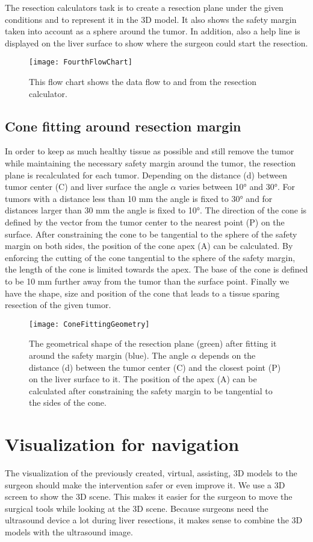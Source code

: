 The resection calculators task is to create a resection plane under the given
conditions and to represent it in the 3D model. It also shows the safety margin taken
into account as a sphere around the tumor. In addition, also a help line is displayed
on the liver surface to show where the surgeon could start the resection.
\begin{figure}[H]
  \centering
 \texttt{[image: FourthFlowChart]}
  \caption{This flow chart shows the data flow to and from the resection calculator.}
  \label{fig:FourthFlowChart}
\end{figure}

\subsection{Cone fitting around resection margin}
In order to keep as much healthy tissue as possible and still remove the tumor
while maintaining the necessary safety margin around the tumor, the resection
plane is recalculated for each tumor. Depending on the distance (d) between tumor
center (C) and liver surface the angle $\alpha$ varies between 10° and 30°. For
tumors with a distance less than 10 mm the angle is fixed to 30° and for
distances larger than 30 mm the angle is fixed to 10°. The direction of the cone
is defined by the vector from the tumor center to the nearest point (P) on the
surface. After constraining the cone to be tangential to the sphere of the
safety margin on both sides, the position of the cone apex (A) can be calculated. By
enforcing the cutting of the cone tangential to the sphere of the
safety margin, the length of the cone is limited towards the apex. The base of
the cone is defined to be 10 mm further away from the tumor than the surface
point. Finally we have the shape, size and position of the cone that leads to a
tissue sparing resection of the given tumor.
\begin{figure}[H]
  \centering
 \texttt{[image: ConeFittingGeometry]}
  \caption{The geometrical shape of the resection plane (green) after fitting it
  around the safety margin (blue). The angle $\alpha$ depends on the distance (d)
  between the tumor center (C) and the closest point (P) on the liver surface to
  it. The position of the apex (A) can be calculated after constraining the
  safety margin to be tangential to the sides of the cone.}
  \label{fig:ConeFittingGeometry}
\end{figure}

\section{Visualization for navigation}
The visualization of the
previously created, virtual, assisting, 3D models to the surgeon should make the intervention
safer or even improve it. We use a 3D screen to show the 3D scene. This
makes it easier for the surgeon to move the surgical tools while looking at the
3D scene.
Because surgeons need the ultrasound device a lot during liver resections, it
makes sense to combine the 3D models with the ultrasound image. 

